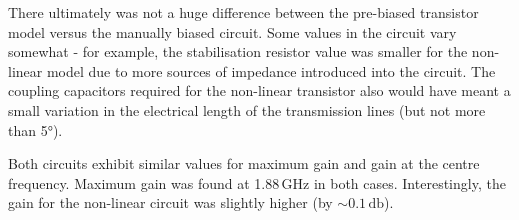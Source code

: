 \documentclass[12pt]{article}
\begin{document}
There ultimately was not a huge difference between the pre-biased transistor model versus the manually biased circuit. 
Some values in the circuit vary somewhat - for example, the stabilisation resistor value was smaller for the non-linear model
due to more sources of impedance introduced into the circuit. The coupling capacitors required for the non-linear transistor 
also would have meant a small variation in the electrical length of the transmission lines (but not more than 5\unit{\degree}).

Both circuits exhibit similar values for maximum gain and gain at the centre frequency. Maximum gain was found at 1.88\,\unit{\giga\hertz}
in both cases. Interestingly, the gain for the non-linear circuit was slightly higher (by $\sim 0.1\,\unit{\decibel}$).
\end{document}
